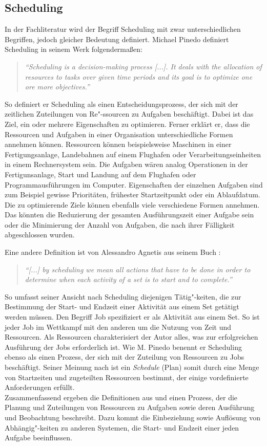\subsection{Scheduling}\label{s:scheduling}
In der Fachliteratur wird der Begriff Scheduling mit zwar unterschiedlichen Begriffen, jedoch gleicher Bedeutung definiert. Michael Pinedo definiert Scheduling in seinem Werk \cite{mpinedo} folgendermaßen:
\begin{quote}
\textit{"`Scheduling is a decision-making process [...]. It deals with the allocation of resources to tasks over given time periods and its goal is to optimize one ore more objectives."'}
\end{quote}
So definiert er Scheduling als einen Entscheidungsprozess, der sich mit der zeitlichen Zuteilungen von Re"-ssourcen zu Aufgaben beschäftigt. Dabei ist das Ziel, ein oder mehrere Eigenschaften zu optimieren. Ferner erklärt er, dass die Ressourcen und Aufgaben in einer Organisation unterschiedliche Formen annehmen können. Ressourcen können beispielsweise Maschinen in einer Fertigungsanlage, Landebahnen auf einem Flughafen oder Verarbeitungseinheiten in einem Rechnersystem sein. Die Aufgaben wären analog Operationen in der Fertigunsanlage, Start und Landung auf dem Flughafen oder Programmausführungen im Computer. Eigenschaften der einzelnen Aufgaben sind zum Beispiel gewisse Prioritäten, frühester Startzeitpunkt oder ein Ablaufdatum. Die zu optimierende Ziele können ebenfalls viele verschiedene Formen annehmen. Das könnten die Reduzierung der gesamten Ausführungszeit einer Aufgabe sein oder die Minimierung der Anzahl von Aufgaben, die nach ihrer Fälligkeit abgeschlossen wurden.

Eine andere Definition ist von Alessandro Agnetis aus seinem Buch \cite{aagnetis}:
\begin{quote}
\textit{"`[...] by scheduling we mean all actions that have to be done in order to determine when each activity of a set is to start and to complete."'}
\end{quote}
So umfasst seiner Ansicht nach Scheduling diejenigen Tätig"-keiten, die zur Bestimmung der Start- und Endzeit einer Aktivität aus einem Set getätigt werden müssen. Den Begriff Job spezifiziert er als Aktivität aus einem Set. So ist jeder Job im Wettkampf mit den anderen um die Nutzung von Zeit und Ressourcen. Als Ressourcen charakterisiert der Autor alles, was zur erfolgreichen Ausführung der Jobs erforderlich ist. Wie M. Pinedo benennt er Scheduling ebenso als einen Prozess, der sich mit der Zuteilung von Ressourcen zu Jobs beschäftigt. Seiner Meinung nach ist ein \textit{Schedule} (Plan) somit durch eine Menge von Startzeiten und zugeteilten Ressourcen bestimmt, der einige vordefinierte Anforderungen erfüllt.\\
Zusammenfassend ergeben die Definitionen aus \cite{mpinedo} und \cite{aagnetis} einen Prozess, der die Planung und Zuteilungen von Ressourcen zu Aufgaben sowie deren Ausführung und Beobachtung beschreibt. Dazu kommt die Einbeziehung sowie Auflösung von Abhängig"-keiten zu anderen Systemen, die Start- und Endzeit einer jeden Aufgabe beeinflussen.

